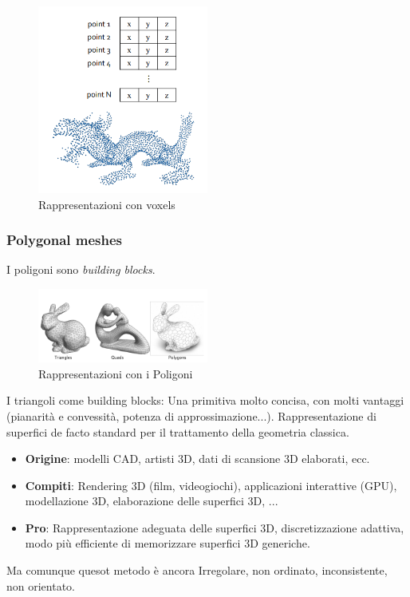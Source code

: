 \begin{figure}[H]
    \centering
    \includegraphics[width=0.5\textwidth]{images/point_Clouds.png} 
    \caption{Rappresentazioni con voxels}
    \label{fig:immagine}
\end{figure}
\subsubsection{Polygonal meshes}
I poligoni sono \textit{building blocks}.
\begin{figure}[H]
    \centering
    \includegraphics[width=0.5\textwidth]{images/PolygonalMesh.png} 
    \caption{Rappresentazioni con i Poligoni}
    \label{fig:immagine}
\end{figure}
I triangoli come building blocks: Una primitiva molto concisa, con molti vantaggi (pianarità e convessità, potenza di approssimazione...). Rappresentazione di superfici de facto standard per il trattamento della geometria classica.
\begin{itemize}
    \item \textbf{Origine}: modelli CAD, artisti 3D, dati di scansione 3D elaborati, ecc.
    \item \textbf{Compiti}: Rendering 3D (film, videogiochi), applicazioni interattive (GPU), modellazione 3D, elaborazione delle superfici 3D, ...
    \item \textbf{Pro}: Rappresentazione adeguata delle superfici 3D, discretizzazione adattiva, modo più efficiente di memorizzare superfici 3D generiche.
\end{itemize}
Ma comunque quesot metodo è ancora  Irregolare, non ordinato, inconsistente, non orientato.


